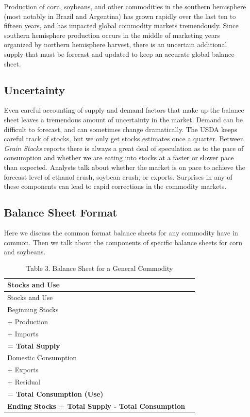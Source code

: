\documentclass[
  letterpaper,
  DIV=11,
  numbers=noendperiod]{scrreprt}
\begin{document}
Production of corn, soybeans, and other commodities in the southern
hemisphere (most notably in Brazil and Argentina) has grown rapidly over
the last ten to fifteen years, and has impacted global commodity markets
tremendously. Since southern hemisphere production occurs in the middle
of marketing years organized by northern hemisphere harvest, there is an
uncertain additional supply that must be forecast and updated to keep an
accurate global balance sheet.

\hypertarget{uncertainty}{%
\subsection{Uncertainty}\label{uncertainty}}

Even careful accounting of supply and demand factors that make up the
balance sheet leaves a tremendous amount of uncertainty in the market.
Demand can be difficult to forecast, and can sometimes change
dramatically. The USDA keeps careful track of stocks, but we only get
stocks estimates once a quarter. Between \emph{Grain Stocks} reports
there is always a great deal of speculation as to the pace of
consumption and whether we are eating into stocks at a faster or slower
pace than expected. Analysts talk about whether the market is on pace to
achieve the forecast level of ethanol crush, soybean crush, or exports.
Surprises in any of these components can lead to rapid corrections in
the commodity markets.

\hypertarget{balance-sheet-format}{%
\subsection{Balance Sheet Format}\label{balance-sheet-format}}

Here we discuss the common format balance sheets for any commodity have
in common. Then we talk about the components of specific balance sheets
for corn and soybeans.

\begin{longtable}[]{@{}ll@{}}
\caption{Table 3. Balance Sheet for a General Commodity}\tabularnewline
\toprule\noalign{}
Stocks and Use & \\
\midrule\noalign{}
\endfirsthead
\toprule\noalign{}
Stocks and Use & \\
\midrule\noalign{}
\endhead
\bottomrule\noalign{}
\endlastfoot
Beginning Stocks & \\
+ Production & \\
+ Imports & \\
\textbf{= Total Supply} & \\
Domestic Consumption & \\
+ Exports & \\
+ Residual & \\
\textbf{= Total Consumption (Use)} & \\
\textbf{Ending Stocks = Total Supply - Total Consumption} & \\
\end{longtable}
\end{document}
